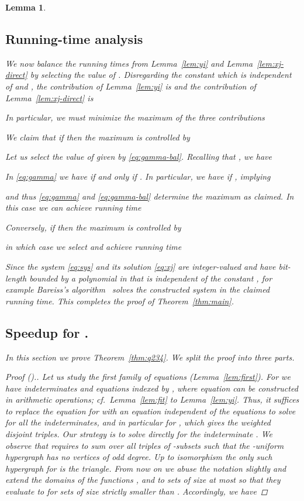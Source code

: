 \documentclass{amsart}
\newtheorem{Lem}{Lemma}
\begin{document}
\begin{Lem}
\subsection{Running-time analysis}
\label{sect:runtime}

We now balance the running times from Lemma~\ref{lem:yi} 
and Lemma~\ref{lem:xj-direct} by selecting the value of 
. Disregarding the constant  which
is independent of  and , the contribution
of Lemma~\ref{lem:yi} is  
and the contribution of Lemma~\ref{lem:xj-direct} is 

In particular, we must minimize the maximum of the three contributions

We claim that if  then the maximum is controlled by

Let us select the value of  given by \eqref{eq:gamma-bal}.
Recalling that , we have

In \eqref{eq:gamma} we have  if and only if .
In particular, we have  if , implying

and thus \eqref{eq:gamma} and \eqref{eq:gamma-bal} determine the maximum
as claimed. In this case we can achieve running time

Conversely, if  then the maximum is controlled by

in which case we select  and achieve running time


Since the system \eqref{eq:sys} and its solution \eqref{eq:xj} are 
integer-valued and have bit-length bounded by a polynomial in 
that is independent of the constant , for example Bareiss's
algorithm~\cite{B68} solves the constructed system in 
the claimed running time.
This completes the proof of Theorem~\ref{thm:main}.


\subsection{Speedup for .}
\label{sect:q234}

In this section we prove Theorem~\ref{thm:q234}. We split the proof
into three parts.

\begin{proof}[Proof ().]
Let us study the first family of equations (Lemma~\ref{lem:first}). 
For  we have indeterminates  and
equations indexed by , where equation  can be 
constructed in  arithmetic operations;
cf.~Lemma~\ref{lem:fit} to Lemma~\ref{lem:yi}.
Thus, it suffices to replace the equation for  with an 
equation independent of the equations  to solve
for all the indeterminates, and in particular for , which
gives the weighted disjoint triples. Our strategy is to solve 
directly for the indeterminate . We observe that  requires
to sum over all triples  of -subsets such that
the -uniform hypergraph  has no vertices of 
odd degree. 
Up to isomorphism the only such hypergraph
for  is the triangle.
From now on we abuse the notation slightly and extend the domains of the functions ,  and  to sets of size {\em at most } so that they evaluate to  for sets of size strictly smaller than .
Accordingly, we have



\end{proof}
\end{Lem}
\end{document}
